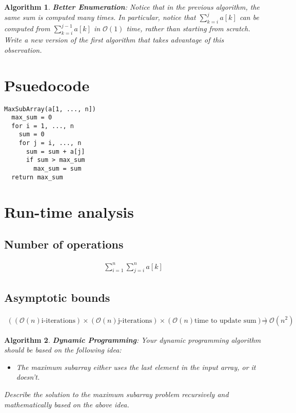 \documentclass{article}
\newtheorem{algorithm}{Algorithm}
\begin{document}
\begin{algorithm}
\textbf{Better Enumeration}: Notice that in the previous algorithm,  the
same sum is computed many times.  In particular, notice that
$\sum_{k=i}^{j}a[k]$ can be computed from $\sum_{k=i}^{j-1}a[k]$ in
$\mathcal{O}(1)$ time, rather than starting from scratch. Write a new version
of the first algorithm that takes advantage of this observation.
\end{algorithm}

\section*{Psuedocode}

\begin{verbatim}
MaxSubArray(a[1, ..., n])
  max_sum = 0
  for i = 1, ..., n
    sum = 0
    for j = i, ..., n
      sum = sum + a[j]
      if sum > max_sum
        max_sum = sum
  return max_sum
\end{verbatim}

\section*{Run-time analysis}

\subsection*{Number of operations}
\begin{eqnarray*}
  \sum_{i=1}^{n}\sum_{j=i}^{n}a[k]
\end{eqnarray*}

\subsection*{Asymptotic bounds}
\begin{eqnarray*}
    ((\mathcal{O}(n) \text{i-iterations}) \times
    (\mathcal{O}(n) \text{j-iterations}) \times
    (\mathcal{O}(n) \text{time to update sum}) ) = \mathcal{O}(n^2)
\end{eqnarray*}


\begin{algorithm}
\textbf{Dynamic Programming}: Your dynamic programming algorithm should be
based on the following idea:

\begin{itemize}
\item The maximum subarray either uses the last element in the input array,
or it doesn't.
\end{itemize}

Describe the solution to the maximum subarray problem recursively and
mathematically based on the above idea.
\end{algorithm}
\end{document}
